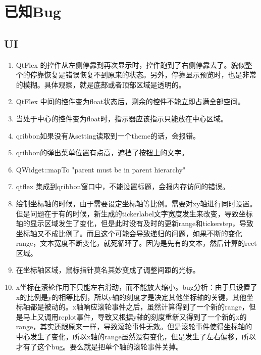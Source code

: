 \section{已知Bug}

\subsection{UI}

\begin{enumerate}
	\item QtFlex 的控件从左侧停靠到再次显示时，控件跑到了右侧停靠去了。貌似整个的停靠恢复是错误恢复不到原来的状态。另外，停靠显示预览时，也是非常的模糊。具体观察，就是底部或者顶部区域是透明的。
	\item QtFlex 中间的控件变为float状态后，剩余的控件不能立即占满全部空间。
	\item 当处于中心的控件变为float时，指示器应该指示只能放在中心区域。
	
	\item qribbon如果没有从setting读取到一个theme的话，会报错。
	
	\item qribbon的弹出菜单位置有点高，遮挡了按钮上的文字。
	
	\item QWidget::mapTo "parent must be in parent hierarchy"
	
	\item qtflex 集成到qribbon窗口中，不能设置标题，会报内存访问的错误。
	
	\item 绘制坐标轴的时候，由于需要设定坐标轴等比例。需要对xy轴进行同时设置。但是问题在于有的时候，新生成的tickerlabel文字宽度发生来改变，导致坐标轴的显示区域发生了变化，但是此时没有及时的更新range和tickerstep，导致坐标轴又不成比例了。而且这个可能会导致递归的问题，如果不断的变化range，文本宽度不断变化，就死循环了。因为是先有的文本，然后计算的rect区域。
	
	\item 在坐标轴区域，鼠标指针莫名其妙变成了调整间距的光标。
	
	\item x坐标在滚轮作用下只能左右滑动，而不能放大缩小。bug分析：由于只设置了x的比例是y的相等比例，所以y轴的刻度才是决定其他坐标轴的关键，其他坐标轴都是被动的。x轴响应滚轮事件之后，虽然计算得到了一个新的range，但是马上又调用replot事件，导致又根据y轴的刻度重新又得到了一个新的x的range，其实还跟原来一样，导致滚轮事件无效。但是滚轮事件使得坐标轴的中心发生了变化，所以x轴的range虽然没有变化，但是发生了左右偏移，所以才有了这个bug。要么就是把单个轴的滚轮事件关掉。
	

\end{enumerate}

